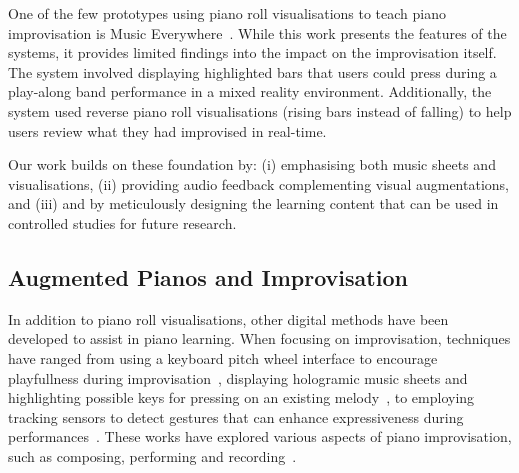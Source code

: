 \documentclass{vgtc}                          %
\begin{document}
\par One of the few prototypes using piano roll visualisations to teach piano improvisation is Music Everywhere~\cite{das2017music}. While this work presents the features of the systems, it provides limited findings into the impact on the improvisation itself. 
The system involved displaying highlighted bars that users could press during a play-along band performance in a mixed reality environment. Additionally, the system used reverse piano roll visualisations (rising bars instead of falling) to help users review what they had improvised in real-time. 

\par Our work builds on these foundation by: (i) emphasising both music sheets and visualisations, (ii) providing audio feedback complementing visual augmentations, and (iii) and by meticulously designing the learning content that can be used in controlled studies for future research. 


\subsection{Augmented Pianos and Improvisation}

\par In addition to piano roll visualisations, other digital methods have been developed to assist in piano learning. When focusing on improvisation,  techniques have ranged from using a keyboard pitch wheel interface to encourage playfullness during improvisation~\cite{kastner2014exploring}, displaying hologramic music sheets and highlighting possible keys for pressing on an existing melody~\cite{uddin2021image, sandnes2019enhanced}, to employing tracking sensors to detect gestures that can enhance expressiveness during performances~\cite{gordon2011roots, dahlstedt2015mapping, mcpherson2015buttons, montano1984effect, newton2011examining}. These works have explored various aspects of piano improvisation, such as composing, performing and recording~\cite{deja2022vision}. 
\end{document}
